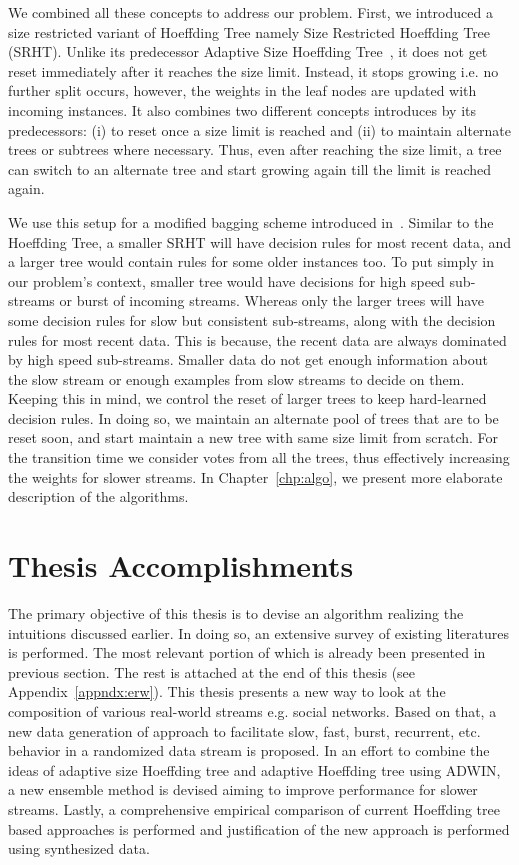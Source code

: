 We combined all these concepts to address our problem. First, we introduced a size restricted variant of Hoeffding Tree namely Size Restricted Hoeffding Tree (SRHT). Unlike its predecessor Adaptive Size Hoeffding Tree~\cite{bifet09:asht}, it does not get reset immediately after it reaches the size limit. Instead, it stops growing i.e. no further split occurs, however, the weights in the leaf nodes are updated with incoming instances. It also combines two different concepts introduces by its predecessors: (i) to reset once a size limit is reached and (ii) to maintain alternate trees or subtrees where necessary. Thus, even after reaching the size limit, a tree can switch to an alternate tree and start growing again till the limit is reached again. 

We use this setup for a modified bagging scheme introduced in~\cite{bifet09:asht}. Similar to the Hoeffding Tree, a smaller SRHT will have decision rules for most recent data, and a larger tree would contain rules for some older instances too. To put simply in our problem's context, smaller tree would have decisions for high speed sub-streams or burst of incoming streams. Whereas only the larger trees will have some decision rules for slow but consistent sub-streams, along with the decision rules for most recent data. This is because, the recent data are always dominated by high speed sub-streams. Smaller data do not get enough information about the slow stream or enough examples from slow streams to decide on them. Keeping this in mind, we control the reset of larger trees to keep hard-learned decision rules. In doing so, we maintain an alternate pool of trees that are to be reset soon, and start maintain a new tree with same size limit from scratch. For the transition time we consider votes from all the trees, thus effectively increasing the weights for slower streams. In Chapter~\ref{chp:algo}, we present more elaborate description of the algorithms.



\section{Thesis Accomplishments}
The primary objective of this thesis is to devise an algorithm realizing the intuitions discussed earlier. In doing so, an extensive survey of existing literatures is performed. The most relevant portion of which is already been presented in previous section. The rest is attached at the end of this thesis (see Appendix~\ref{appndx:erw}). This thesis presents a new way to look at the composition of various real-world streams e.g. social networks. Based on that, a new data generation of approach to facilitate slow, fast, burst, recurrent, etc. behavior in a randomized data stream is proposed. In an effort to combine the ideas of adaptive size Hoeffding tree and adaptive Hoeffding tree using ADWIN, a new ensemble method is devised aiming to improve performance for slower streams. Lastly, a comprehensive empirical comparison of current Hoeffding tree based approaches is performed and justification of the new approach is performed using synthesized data.


